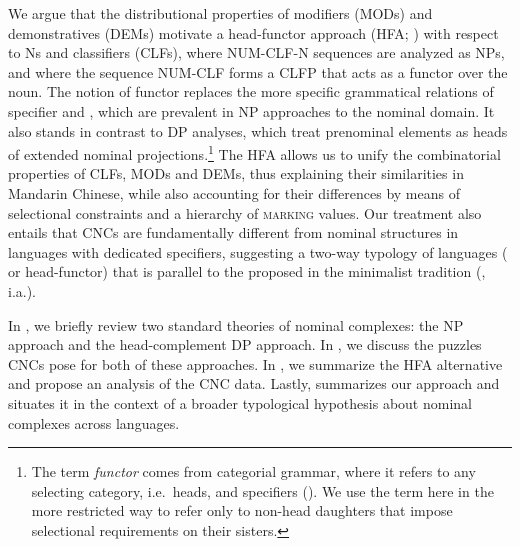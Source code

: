 \documentclass[output=paper,colorlinks,citecolor=brown]{langscibook}
\begin{document}


We argue that the distributional properties of modifiers (MODs) and demonstratives (DEMs) 
motivate a head-functor approach (HFA; \citealp{VanEynde06a}) with respect to Ns and classifiers (CLFs), where NUM-CLF-N sequences are analyzed as  NPs, and where the sequence NUM-CLF forms a CLFP that acts as a functor over the noun. The notion of functor replaces the more specific grammatical relations of specifier and , which are prevalent in NP approaches to the nominal domain. It also stands in contrast to DP analyses, which treat prenominal elements as heads of extended nominal projections.\footnote{The term \emph{functor} comes from categorial grammar, where it refers to any selecting category, i.e.\ heads,  and specifiers (\citealt[23]{Bouma88a}). We use the term here in the more restricted way to refer only to non-head daughters that impose selectional requirements on their sisters.}
The HFA allows us to unify the combinatorial properties of CLFs, MODs and DEMs, thus explaining their similarities in Mandarin Chinese, while also accounting for their differences by means of selectional constraints and a hierarchy of \textsc{marking} values. %
Our treatment also entails that CNCs are fundamentally different from nominal structures in languages with dedicated specifiers, suggesting a two-way typology of languages ( or head-functor) that is parallel to the  proposed in the minimalist tradition (\citealt{boskovic2008will, BovskovicCo2011a, Despic2011a, Phan2015a}, i.a.). %

In ,  we briefly review two standard theories of nominal complexes: the  NP approach and the head-complement DP approach.   In , we discuss the puzzles CNCs pose for both of these approaches. In , we summarize the HFA alternative  and propose an analysis of the CNC data. Lastly,  summarizes our approach and situates it in the context of a broader typological hypothesis about nominal complexes across languages.%
\end{document}
